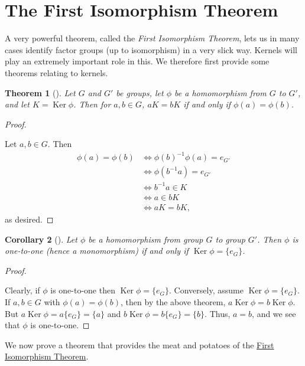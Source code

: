 \documentclass[10pt,openany,oneside]{book}
\theoremstyle{plain}
\newtheorem{theorem}{Theorem}[section]
\newtheorem{corollary}[theorem]{Corollary}
\theoremstyle{definition}
\theoremstyle{definition}
\theoremstyle{definition}
\theoremstyle{definition}
\numberwithin{equation}{section}
\DeclareMathOperator{\Ker}{Ker}
\newcommand{\amp}{&}
\begin{document}
\section[{The First Isomorphism Theorem}]{The First Isomorphism Theorem}\label{section-28}
A very powerful theorem, called the \emph{First Isomorphism Theorem}, lets us in many cases identify factor groups (up to isomorphism) in a very slick way. Kernels will play an extremely important role in this. We therefore first provide some theorems relating to kernels.%
\begin{theorem}[{}]\label{kermean}
Let \(G\) and \(G'\) be groups, let \(\phi\) be a homomorphism from \(G\) to \(G'\), and let \(K=\Ker \phi\). Then for \(a,b\in G\), \(aK=bK\) if and only if \(\phi(a)=\phi(b)\).%
\end{theorem}
\begin{proof}\hypertarget{proof-47}{}
Let \(a,b\in G\). Then%
\begin{align*}
\phi(a)=\phi(b)\amp \Leftrightarrow
\phi(b)^{-1}\phi(a)=e_{G'}\\
\amp \Leftrightarrow \phi(b^{-1}a)=e_{G'}\\
\amp \Leftrightarrow b^{-1}a\in K\\
\amp \Leftrightarrow a \in bK\\
\amp \Leftrightarrow aK=bK,
\end{align*}
as desired.%
\end{proof}
\begin{corollary}[{}]\label{kerone}
Let \(\phi\) be a homomorphism from group \(G\) to group \(G'\). Then \(\phi\) is one-to-one (hence a monomorphism) if and only if \(\Ker \phi=\{e_G\}\).%
\end{corollary}
\begin{proof}\hypertarget{proof-48}{}
Clearly, if \(\phi\) is one-to-one then \(\Ker \phi=\{e_G\}\). Conversely, assume \(\Ker \phi=\{e_G\}\). If \(a,b\in G\) with \(\phi(a)=\phi(b)\), then by the above theorem, \(a\Ker \phi=b\Ker
\phi\). But \(a\Ker \phi=a\{e_G\}=\{a\}\) and \(b\Ker
\phi=b\{e_G\}=\{b\}\). Thus, \(a=b\), and we see that \(\phi\) is one-to-one.%
\end{proof}
We now prove a theorem that provides the meat and potatoes of the \hyperref[fit]{First Isomorphism Theorem}.%
\end{document}
